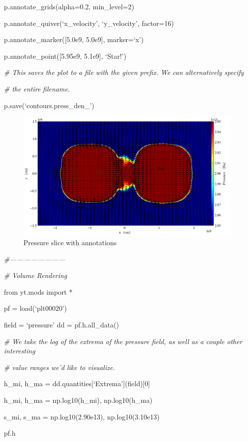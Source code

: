 p.annotate\_grids(alpha=0.2, min\_level=2)

p.annotate\_quiver(`x\_velocity', `y\_velocity', factor=16)

p.annotate\_marker([5.0e9, 5.0e9], marker=`x')

p.annotate\_point([5.95e9, 5.1e9], `Star!')

{\it\# This saves the plot to a file with the given prefix. We can alternatively specify}
{\setlength{\parskip}{0pt}

{\it\# the entire filename.}

p.save(`contours.press\_den\_')
}
\begin{figure}[h]
\centering
\includegraphics[width=6in]{Visualization/Slice_z_pressure}
\caption{Pressure slice with annotations}
\end{figure}

{\it\#------------------------}


{\it\# Volume Rendering}
{\setlength{\parskip}{0pt}

from yt.mods import *
}

pf = load(`plt00020')

field = `pressure'
dd = pf.h.all\_data()

{\it\# We take the log of the extrema of the pressure field, as well as a couple other interesting}
{\setlength{\parskip}{0pt}

{\it\# value ranges we'd like to visualize.}

h\_mi, h\_ma = dd.quantities[`Extrema'](field)[0]
}

h\_mi, h\_ma = np.log10(h\_mi), np.log10(h\_ma)

s\_mi, s\_ma =  np.log10(2.90e13), np.log10(3.10e13)

pf.h

